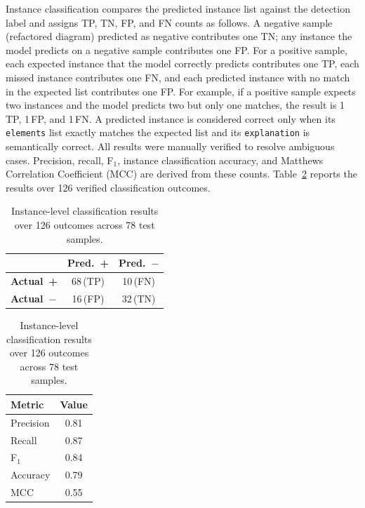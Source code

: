 \documentclass[sigconf,review,anonymous]{acmart}
\begin{document}
Instance classification compares the predicted instance list against the
detection label and assigns TP, TN, FP, and FN counts as follows.  A
negative sample (refactored diagram) predicted as negative contributes one
TN; any instance the model predicts on a negative sample contributes one FP.
For a positive sample, each expected instance that the model correctly
predicts contributes one TP, each missed instance contributes one FN, and
each predicted instance with no match in the expected list contributes one
FP.  For example, if a positive sample expects two instances and the model
predicts two but only one matches, the result is 1\,TP, 1\,FP, and 1\,FN.
A predicted instance is considered correct only when its \texttt{elements}
list exactly matches the expected list and its \texttt{explanation} is
semantically correct. All results were manually verified to resolve ambiguous cases.  Precision, recall, F$_1$,
instance classification accuracy, and Matthews Correlation Coefficient (MCC)
are derived from these counts.  Table~\ref{tab:metrics} reports the results
over 126 verified classification outcomes.

\begin{table}[h]
\centering
\caption{Instance-level classification results over 126 outcomes across 78 test samples.}
\label{tab:metrics}
\begin{minipage}[t]{0.46\linewidth}
\centering
\vspace{0pt}
\begin{tabular}{lcc}
\toprule
& \textbf{Pred.\ +} & \textbf{Pred.\ $-$} \\
\midrule
\textbf{Actual\ +} & 68\,(TP) & 10\,(FN) \\
\textbf{Actual\ $-$} & 16\,(FP) & 32\,(TN) \\
\bottomrule
\end{tabular}
\end{minipage}
\hfill
\begin{minipage}[t]{0.46\linewidth}
\centering
\vspace{0pt}
\begin{tabular}{lc}
\toprule
\textbf{Metric} & \textbf{Value} \\
\midrule
Precision  & 0.81 \\
Recall     & 0.87 \\
F$_1$      & 0.84 \\
Accuracy   & 0.79 \\
MCC        & 0.55 \\
\bottomrule
\end{tabular}
\end{minipage}
\end{table}
\end{document}
